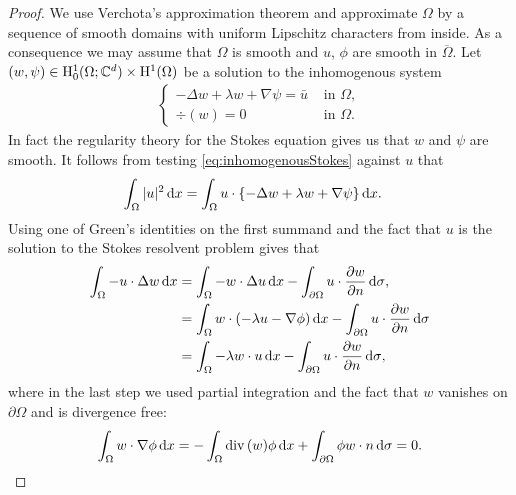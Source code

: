 \begin{proof}
  We use Verchota's approximation theorem \cite{verchotaDiss} and approximate $\Omega$ by a sequence of smooth domains with uniform Lipschitz characters from inside.
  As a consequence we may assume that $\Omega$ is smooth and $u$, $\phi$ are smooth in $\overline\Omega$.
  Let $(w,\psi) \in \mathrm{H}_0^1(\Omega; \mathbb{C}^d) \times \mathrm{H}^1(\Omega)$ be a solution to the inhomogenous system
  \begin{align}
    \label{eq:inhomogenousStokes}
    \begin{cases}
      - \Delta w + \lambda w + \nabla \psi = \bar u &\text{ in } \Omega, \\
      \div(w) = 0 &\text{ in } \Omega.
    \end{cases}
  \end{align}
  In fact the regularity theory for the Stokes equation gives us that $w$ and $\psi$ are smooth.
  It follows from testing \eqref{eq:inhomogenousStokes} against $u$ that
  \begin{align}
    \label{eq:testingInhomogenousStokes}
    \int_\Omega |u|^2 \, {\operatorname{d}\!{x}}
    &= \int_\Omega u \cdot \{ - \Delta w + \lambda w + \nabla \psi \} \, {\operatorname{d}\!{x}}.
  \end{align}
  Using one of Green's identities on the first summand and the fact that $u$ is the solution to the Stokes resolvent problem gives that
  \begin{align*}
    \int_\Omega -u \cdot \Delta w \, {\operatorname{d}\!{x}}
    &= \int_\Omega -w \cdot \Delta u \, {\operatorname{d}\!{x}} - \int_{\partial\Omega} u \cdot \frac{\partial w}{\partial n} \, {\operatorname{d}\!{\sigma}}, \\
    &= \int_\Omega w \cdot ( -\lambda u - \nabla \phi) \, {\operatorname{d}\!{x}} - \int_{\partial\Omega} u \cdot \frac{\partial w}{\partial n} \, {\operatorname{d}\!{\sigma}} \\
    &= \int_\Omega -\lambda w \cdot u \, {\operatorname{d}\!{x}} - \int_{\partial\Omega} u \cdot \frac{\partial w}{\partial n} \, {\operatorname{d}\!{\sigma}}, 
  \end{align*}
  where in the last step we used partial integration and the fact that $w$ vanishes on $\partial\Omega$ and is divergence free:
  \begin{align*}
    \int_\Omega w \cdot \nabla\phi \d x = -\int_\Omega \div(w) \phi \d x + \int_{\partial\Omega} \phi w \cdot n \d\sigma = 0.

\end{align*}
\end{proof}
